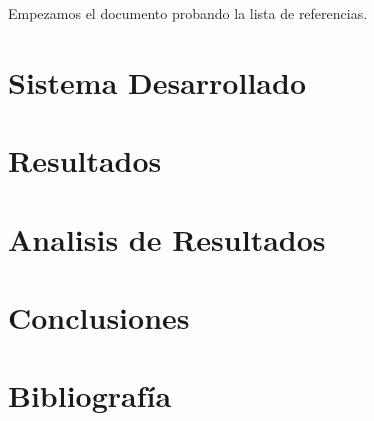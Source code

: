 \documentclass[journal,trans]{IEEEtran}
\begin{document}
	Empezamos el documento \cite{SarahLHarris2010} probando la lista de referencias.
	
	\section{Sistema Desarrollado}
	
	\section{Resultados}
	
	\section{Analisis de Resultados}
	
	\section{Conclusiones}
	
	\section{Bibliografía}
	
	
	
	
\end{document}
